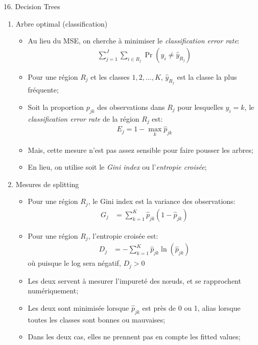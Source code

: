 \documentclass[12pt, titlepage, french]{report}
\begin{document}
\begin{CHPT_SUMM}[label = {DECISION-TREES}]{16. Decision Trees}
\begin{enumerate}
\begin{itemize}
		\item	Nous sélectionnons alors le $\alpha$ optimal selon la \textit{validation croisée};
		\end{itemize}
%		
	\item[]	Arbre optimal (classification)
		\begin{itemize}
		\item	Au lieu du MSE, on cherche à minimiser le \textit{classification error rate}:
			\begin{align*}
			\sum_{j = 1}^{J} \sum_{i \in R_{j}} \Pr(y_{i} \neq \hat{y}_{R_{j}})
			\end{align*}
		\item	Pour une région $R_{j}$ et les classes $1, 2, \dots, K$, $\hat{y}_{R_{j}}$ est la classe la plus fréquente;
		\item	Soit la proportion $p_{jk}$ des observations dans $R_{j}$ pour lesquelles $y_{i} = k$, le \textit{classification error rate} de la région $R_{j}$ est:
			\begin{align*}
			E_{j}	=	1 - \underset{k}{\max} \hat{p}_{jk}
			\end{align*}
		\item	Mais, cette mesure n'est pas assez sensible pour faire pousser les arbres;
		\item	En lieu, on utilise soit le \textit{Gini index} ou l'\textit{entropie croisée};
		\end{itemize}
%		
	\item[]	Mesures de splitting
		\begin{itemize}
		\item	Pour une région $R_{j}$, le Gini index est la variance des observations: 
			\begin{align*}
			G_{j}	&=	\sum_{k = 1}^{K} \hat{p}_{jk} (1 - \hat{p}_{jk})
			\end{align*}
		\item	Pour une région $R_{j}$, l'entropie croisée est:
			\begin{align*}
			D_{j}	&=	-\sum_{k = 1}^{K} \hat{p}_{jk} \ln (\hat{p}_{jk})
			\end{align*}
				où puisque le log sera négatif, $D_{j} > 0$
		\item	Les deux servent à mesurer l'impureté des nœuds, et se rapprochent numériquement;
		\item	Les deux sont minimisée lorsque $\hat{p}_{jk}$ est près de 0 ou 1, alias lorsque toutes les classes sont bonnes ou mauvaises;
		\item	Dans les deux cas, elles ne prennent pas en compte les fitted values;

\end{itemize}
\end{enumerate}
\end{CHPT_SUMM}
\end{document}
